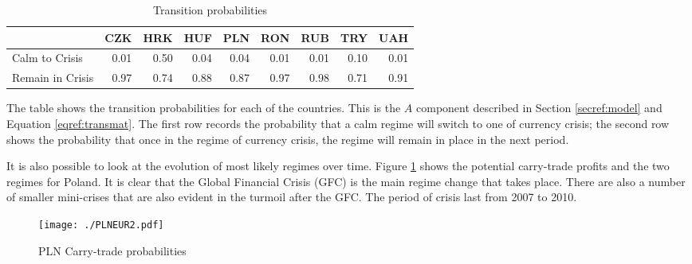 \documentclass[12pt, a4paper, oneside]{article}\usepackage[]{graphicx}\usepackage[]{color}
\begin{document}
\begin{table}[t]
\begin{threeparttable}
\centering
\begin{tabular}{p{3cm}rrrrrrrr}
  \hline
& CZK & HRK & HUF & PLN & RON & RUB & TRY & UAH\\ 
  \hline
Calm to Crisis & 0.01 & 0.50 & 0.04 & 0.04 & 0.01 & 0.01 & 0.10 & 0.01\\
Remain in Crisis & 0.97 & 0.74 & 0.88 & 0.87 & 0.97 & 0.98 & 0.71 & 0.91 \\
  \hline
\end{tabular}
\begin{tablenotes}
\small
\item  The table shows the transition probabilities for each of the countries.  This is the $A$ component described in Section \ref{secref:model} and Equation \ref{eqref:transmat}. The first row records the probability that a calm regime will switch to one of currency crisis; the second row shows the probability that once in the regime of currency crisis, the regime will remain in place in the next period. 
\end{tablenotes}
\caption{Transition probabilities}
\label{tabref:transprob}
\end{threeparttable}
\end{table}

It is also possible to look at the evolution of most likely regimes over time.  Figure \ref{figref:pln} shows the potential carry-trade profits and the two regimes for Poland.  It is clear that the Global Financial Crisis (GFC) is the main regime change that takes place.  There are also a number of smaller mini-crises that are also evident in the turmoil after the GFC. The period of crisis last from 2007 to 2010. 

\begin{figure}[ht]
\centering
\texttt{[image: ./PLNEUR2.pdf]}
\caption{PLN Carry-trade probabilities}
\label{figref:pln}
\end{figure}
\end{document}
